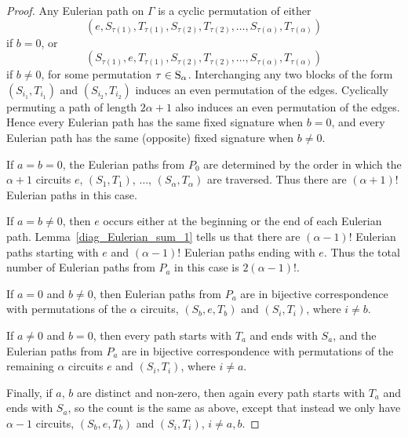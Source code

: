 \documentclass{amsproc}
\theoremstyle{definition}
\theoremstyle{remark}
\numberwithin{equation}{section}
\newcommand{\Sym}{{\rm S}}
\begin{document}
\begin{proof}
Any Eulerian path on $\Gamma$ is a cyclic permutation of either
\[(e,S_{\tau(1)},T_{\tau(1)},S_{\tau(2)},T_{\tau(2)},\dots,S_{\tau(\alpha)},T_{\tau(\alpha)})\]
if $b=0$, or
\[(S_{\tau(1)},e,T_{\tau(1)},S_{\tau(2)},T_{\tau(2)},\dots,S_{\tau(\alpha)},T_{\tau(\alpha)})\]
if $b\neq 0$, for some permutation $\tau\in \Sym_{\alpha}$.  
Interchanging any two blocks of the form $(S_{i_1},T_{i_1})$ and $(S_{i_2},T_{i_2})$ induces 
an even permutation of the edges. Cyclically permuting a path of length $2 \alpha+1$ also induces an even permutation of the edges. 
Hence every Eulerian path has the same fixed signature when $b=0$, and every Eulerian path has the same (opposite) fixed signature when $b\neq 0$.

If $a = b = 0$, the Eulerian paths from $P_0$ are determined by the order in which the 
$\alpha + 1$ circuits $e$, $(S_1, T_1)$, $\ldots$, $(S_{\alpha}, T_{\alpha})$ are traversed. Thus there are $(\alpha + 1)!$ Eulerian paths in this case.

If $a = b \neq 0$, then $e$ occurs either at the beginning or the end of each Eulerian path. Lemma~\ref{diag_Eulerian_sum_1}
tells us that there are $(\alpha-1)!$ Eulerian paths starting with $e$ and $(\alpha-1)!$ Eulerian paths ending with $e$.
Thus the total number of Eulerian paths from $P_a$ in this case is $2 (\alpha-1)!$.

If $a = 0$ and $b \neq 0$, then Eulerian paths from $P_a$ are in bijective correspondence with permutations of the $\alpha$ circuits, 
$(S_b, e, T_b)$ and $(S_i, T_i)$, where $i \neq b$. 

If $a \neq 0$ and $b = 0$, then every path starts with $T_a$ and ends with $S_a$, and the Eulerian paths from $P_a$ are in bijective correspondence 
with permutations of the remaining $\alpha$ circuits $e$ and $(S_i, T_i)$, where $i \neq a$.

Finally, if $a$, $b$ are distinct and non-zero, then again every path starts with $T_a$ and ends with $S_a$, so the count is the same as above, 
except that instead we only have $\alpha - 1$ circuits, $(S_b, e, T_b)$ and $(S_i, T_i)$, $i \neq a, b$.
\end{proof}
\end{document}
